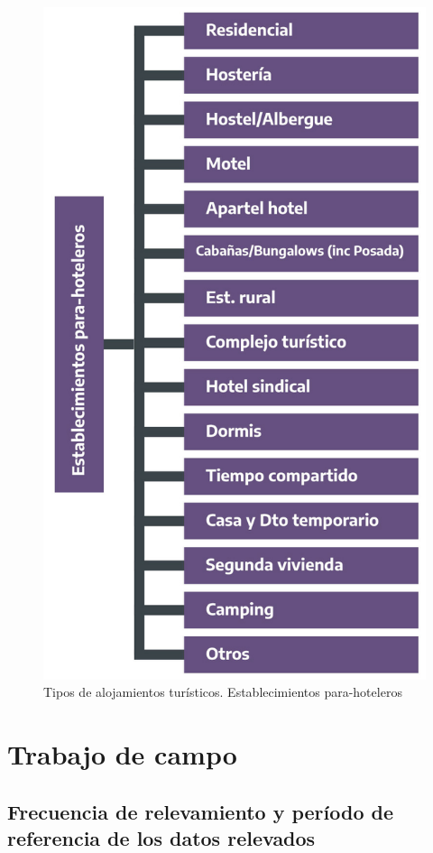 \documentclass[
]{book}
\begin{document}
\begin{figure}

{\centering \includegraphics[width=0.8\linewidth]{imagenes/figura_3_2} 

}

\caption{Tipos de alojamientos turísticos. Establecimientos para-hoteleros}\label{fig:establecimientos-para-hoteleros}
\end{figure}

\hypertarget{trabajo-de-campo}{%
\section{Trabajo de campo}\label{trabajo-de-campo}}

\hypertarget{frecuencia-de-relevamiento-y-peruxedodo-de-referencia-de-los-datos-relevados}{%
\subsection{Frecuencia de relevamiento y período de referencia de los datos relevados}\label{frecuencia-de-relevamiento-y-peruxedodo-de-referencia-de-los-datos-relevados}}
\end{document}
